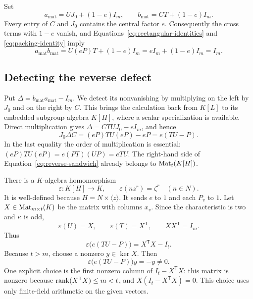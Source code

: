 Set
\begin{equation}
\label{eq:square-elements}
a_{\mathrm{mat}}=UJ_0+(1-e)I_m,
\qquad
b_{\mathrm{mat}}=CT+(1-e)I_m.
\end{equation}
Every entry of $C$ and $J_0$ contains the central factor $e$.
Consequently the cross terms with $1-e$ vanish, and
Equations~\eqref{eq:rectangular-identities} and
\eqref{eq:packing-identity} imply
\begin{equation}
\label{eq:square-forward-product}
a_{\mathrm{mat}}b_{\mathrm{mat}}
=U(eP)T+(1-e)I_m
=eI_m+(1-e)I_m=I_m.
\end{equation}

\subsection{Detecting the reverse defect}

Put $\Delta=b_{\mathrm{mat}}a_{\mathrm{mat}}-I_m$. We detect its
nonvanishing by multiplying on the left by $J_0$ and on the right by
$C$. This brings the calculation back from $K[L]$ to its embedded
subgroup algebra $K[H]$, where a scalar specialization is available.
Direct multiplication
gives $\Delta=CTUJ_0-eI_m$, and hence
\begin{equation}
\label{eq:reverse-sandwich}
J_0\Delta C=(eP)TU(eP)-eP=e(TU-P).
\end{equation}
In the last equality the order of multiplication is essential:
$(eP)TU(eP)=e(PT)(UP)=eTU$. The right-hand side of
Equation~\eqref{eq:reverse-sandwich} already belongs to
$\operatorname{Mat}_t(K[H])$.

There is a $K$-algebra homomorphism
\begin{equation}
\label{eq:subgroup-specialization}
\varepsilon:K[H]\longrightarrow K,
\qquad
\varepsilon(nz^r)=\zeta^r\quad(n\in N).
\end{equation}
It is well-defined because $H=N\times\langle z\rangle$.
It sends $e$ to $1$ and each $P_v$ to $1$.
Let $X\in\operatorname{Mat}_{m\times t}(K)$ be the matrix with columns $x_v$.
Since the characteristic is two and $\kappa$ is odd,
\[
\varepsilon(U)=X,\qquad
\varepsilon(T)=X^{\mathsf T},\qquad
XX^{\mathsf T}=I_m.
\]
Thus
\begin{equation}
\label{eq:specialized-defect}
\varepsilon\bigl(e(TU-P)\bigr)=X^{\mathsf T}X-I_t.
\end{equation}
Because $t>m$, choose a nonzero $y\in\ker X$. Then
\begin{equation}
\label{eq:nonzero-witness}
\varepsilon\bigl(e(TU-P)\bigr)y=-y\ne0.
\end{equation}
One explicit choice is the first nonzero column of $I_t-X^{\mathsf T}X$:
this matrix is nonzero because $\operatorname{rank}(X^{\mathsf T}X)\le m<t$, and
$X(I_t-X^{\mathsf T}X)=0$. This choice uses only finite-field
arithmetic on the given vectors.

